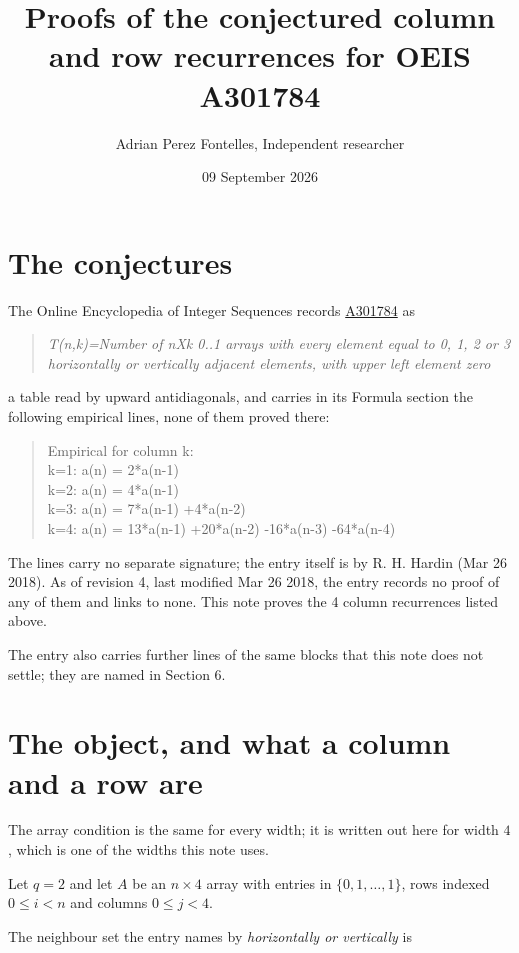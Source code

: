 \documentclass[11pt]{article}
\title{Proofs of the conjectured column and row recurrences for OEIS A301784}
\author{Adrian Perez Fontelles, Independent researcher}
\date{09 September 2026}
\theoremstyle{definition}
\begin{document}
\maketitle
\section{The conjectures}

The Online Encyclopedia of Integer Sequences records \href{https://oeis.org/A301784}{A301784} as

\begin{quote}\itshape T(n,k)=Number of nXk 0..1 arrays with every element equal to 0, 1, 2 or 3 horizontally or vertically adjacent elements, with upper left element zero\end{quote}

a table read by upward antidiagonals, and carries in its Formula section the following empirical lines, none of them proved there:

\begin{quote}\ttfamily Empirical for column k:\\
k=1: a(n) = 2*a(n-1)\\k=2: a(n) = 4*a(n-1)\\k=3: a(n) = 7*a(n-1) +4*a(n-2)\\k=4: a(n) = 13*a(n-1) +20*a(n-2) -16*a(n-3) -64*a(n-4)\end{quote}

The lines carry no separate signature; the entry itself is by R. H. Hardin (Mar 26 2018). As of revision 4, last modified Mar 26 2018, the entry records no proof of any of them and links to none. This note proves the 4 column recurrences listed above.

The entry also carries further lines of the same blocks that this note does not settle; they are named in Section 6.

\section{The object, and what a column and a row are}

The array condition is the same for every width; it is written out here for width $4$, which is one of the widths this note uses.

Let $q = 2$ and let $A$ be an $n \times 4$ array with entries in $\{0,1,\dots,1\}$, rows indexed $0 \le i < n$ and columns $0 \le j < 4$.

The neighbour set the entry names by {\itshape horizontally or vertically} is
\end{document}

